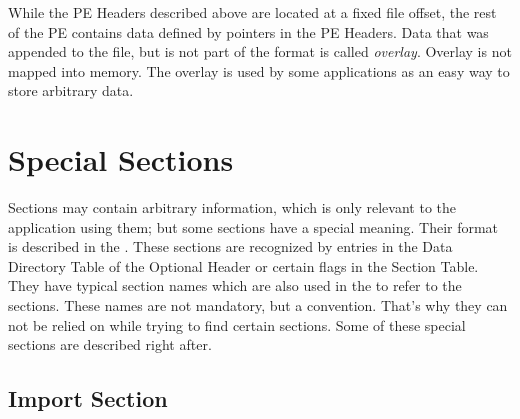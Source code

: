 While the PE Headers described above are located at a fixed file offset, the rest of the PE contains data defined by pointers in the PE Headers. Data that was appended to the file, but is not part of the \PE{} format is called \emph{overlay}. Overlay is not mapped into memory. The overlay is used by some applications as an easy way to store arbitrary data.

\section{Special Sections}

Sections may contain arbitrary information, which is only relevant to the application using them; but some sections have a special meaning. Their format is described in the \PECOFF{} \cite{pespec}. These sections are recognized by entries in the Data Directory Table of the Optional Header or certain flags in the Section Table. They have typical section names which are also used in the \PECOFF{} to refer to the sections. These names are not mandatory, but a convention. That's why they can not be relied on while trying to find certain sections.
Some of these special sections are described right after. 

\subsection*{Import Section}

